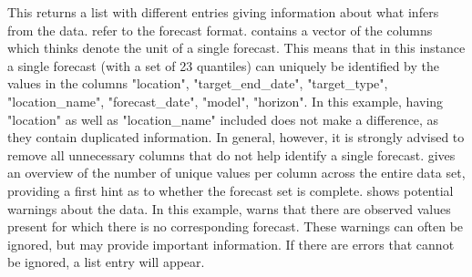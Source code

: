 \documentclass[article,shortnames]{jss}\usepackage[]{graphicx}\usepackage[]{color}
\begin{document}
This returns a list with different entries giving information about what  infers from the data.   refer to the forecast format.  contains a vector of the columns which  thinks denote the unit of a single forecast. This means that in this instance a single forecast (with a set of 23 quantiles) can uniquely be identified by the values in the columns "location", "target\_end\_date", "target\_type", "location\_name", "forecast\_date", "model", "horizon". In this example, having "location" as well as "location\_name" included does not make a difference, as they contain duplicated information. In general, however, it is strongly advised to remove all unnecessary columns that do not help identify a single forecast.  gives an overview of the number of unique values per column across the entire data set, providing a first hint as to whether the forecast set is complete.  shows potential warnings about the data. In this example,  warns that there are observed values present for which there is no corresponding forecast. These warnings can often be ignored, but may provide important information. If there are errors that cannot be ignored, a list entry  will appear. 
\end{document}
